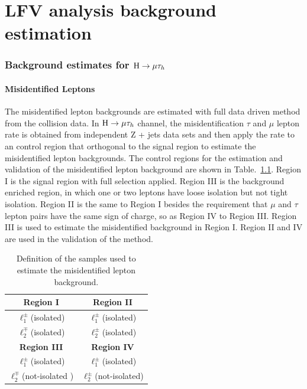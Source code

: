 \chapter{LFV analysis background estimation}

\subsection{Background estimates for $\mathrm{H}\to \mu\tau_{h}$}


\subsubsection{Misidentified Leptons}

The misidentified lepton backgrounds are estimated with full data driven method from the collision data. In $\mathrm{H}\to \mu\tau_{h}$ channel, the misidentification $\tau$ and $\mu$ lepton rate is obtained from independent Z + jets data sets and then apply the rate to an control region that orthogonal to the signal region to estimate the misidentified lepton backgrounds.  The control regions for the estimation and validation of the misidentified lepton background are shown in Table.~\ref{tab:fakeratediagram}. Region I is the signal region with full selection applied. Region III is the background enriched region, in which one or two leptons have loose isolation but not tight isolation. Region II is the same to Region I besides the requirement that $\mu$ and $\tau$ lepton pairs have the same sign of charge, so as Region IV to Region III. Region III is used to estimate the misidentified background in Region I. Region II and IV are used in the validation of the method. 


\begin{table}[hbt]
 \centering
 {
 \renewcommand{\arraystretch}{1.1}
 \caption{Definition of the samples used to estimate the misidentified lepton background.}
  \label{tab:fakeratediagram}
  \begin{tabular}{c|c} \hline
\textbf{Region I}              &  \textbf{Region II}             \\ \hline
$\ell^{\pm}_{1}$(isolated)  &  $\ell^{\pm}_{1}$(isolated)             \\
$\ell^{\mp}_{2}$(isolated)  &  $\ell^{\pm}_{2}$(isolated)             \\

\hline \hline
\textbf{Region III}           &  \textbf{Region IV}             \\ \hline
$\ell^{\pm}_{1}$(isolated)  &  $\ell^{\pm}_{1}$(isolated)             \\
$\ell^{\mp}_{2}$(not-isolated )  &  $\ell^{\pm}_{2}$(not-isolated)             \\
\hline
  \end{tabular}
}
\end{table}



